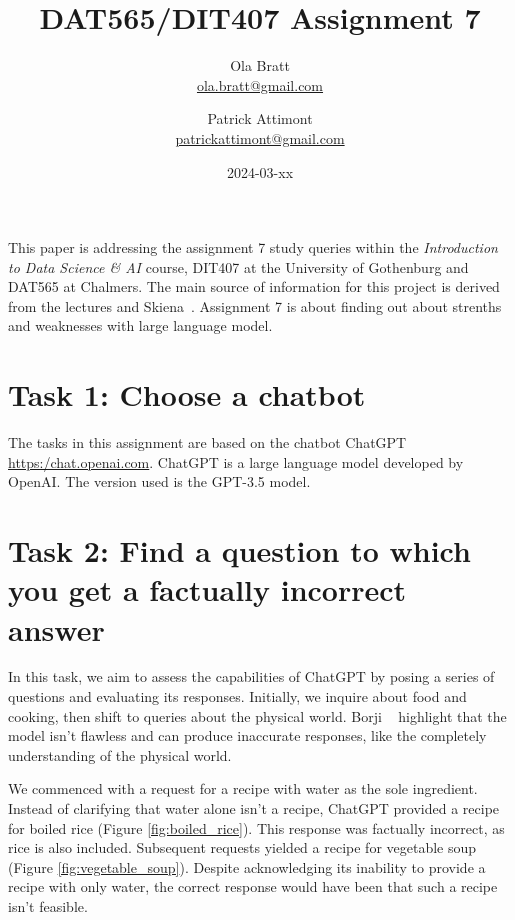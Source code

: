 \documentclass[a4paper]{article}
\begin{document}
\author{Ola Bratt \\
  \href{mailto:ola.bratt@gmail.com}{ola.bratt@gmail.com}
  \and
  Patrick Attimont \\
  \href{patrickattimont@gmail.com}{patrickattimont@gmail.com}
}

\title{DAT565/DIT407 Assignment 7}
\date{2024-03-xx}

\maketitle

This paper is addressing the assignment 7 study queries within the \emph{Introduction to Data Science \& AI} course, DIT407 at 
the University of Gothenburg and DAT565 at Chalmers. The main source of information for this project
is derived from the lectures and Skiena~\cite{Skiena:2024}. Assignment 7 is about finding out about strenths and weaknesses with large language model.

\section*{Task 1: Choose a chatbot}

The tasks in this assignment are based on the chatbot ChatGPT \href{https:/chat.openai.com}{https:/chat.openai.com}. 
ChatGPT is a large language model developed by OpenAI.
 The version used is the GPT-3.5 model.

 \section*{Task 2: Find a question to which you get a factually incorrect answer}


 In this task, we aim to assess the capabilities of ChatGPT by posing a series of questions and evaluating its responses. 
 Initially, we inquire about food and cooking, then shift to queries about the physical world. 
 Borji ~\cite{Borji:2023} highlight that the model isn't flawless and can produce inaccurate responses, 
 like the completely understanding of the physical world.


 We commenced with a request for a recipe with water as the sole ingredient. 
 Instead of clarifying that water alone isn't a recipe, ChatGPT provided a recipe for boiled rice (Figure \ref{fig:boiled_rice}). 
 This response was factually incorrect, as rice is also included. 
 Subsequent requests yielded a recipe for vegetable soup (Figure \ref{fig:vegetable_soup}). 
 Despite acknowledging its inability to provide a recipe with only water, the correct response would have been that such a recipe isn't feasible.
 
\end{document}
